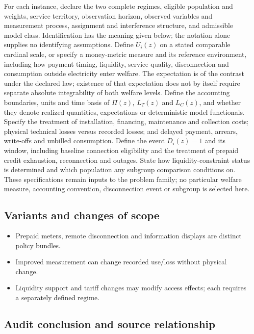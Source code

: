 \documentclass[11pt,a4paper]{article}
\begin{document}
For each instance, declare the two complete regimes, eligible population and weights, service territory, observation horizon, observed variables and measurement process, assignment and interference structure, and admissible model class. Identification has the meaning given below; the notation alone supplies no identifying assumptions. Define \(U_i(z)\) on a stated comparable cardinal scale, or specify a money-metric measure and its reference environment, including how payment timing, liquidity, service quality, disconnection and consumption outside electricity enter welfare. The expectation is of the contrast under the declared law; existence of that expectation does not by itself require separate absolute integrability of both welfare levels. Define the accounting boundaries, units and time basis of \(\Pi(z)\), \(L_T(z)\) and \(L_C(z)\), and whether they denote realized quantities, expectations or deterministic model functionals. Specify the treatment of installation, financing, maintenance and collection costs; physical technical losses versus recorded losses; and delayed payment, arrears, write-offs and unbilled consumption. Define the event \(D_i(z)=1\) and its window, including baseline connection eligibility and the treatment of prepaid credit exhaustion, reconnection and outages. State how liquidity-constraint status is determined and which population any subgroup comparison conditions on. These specifications remain inputs to the problem family; no particular welfare measure, accounting convention, disconnection event or subgroup is selected here.

\subsection*{Variants and changes of scope}

\begin{itemize}
\item Prepaid meters, remote disconnection and information displays are distinct policy bundles.
\item Improved measurement can change recorded use/loss without physical change.
\item Liquidity support and tariff changes may modify access effects; each requires a separately defined regime.
\end{itemize}

\subsection*{Audit conclusion and source relationship}
\end{document}
